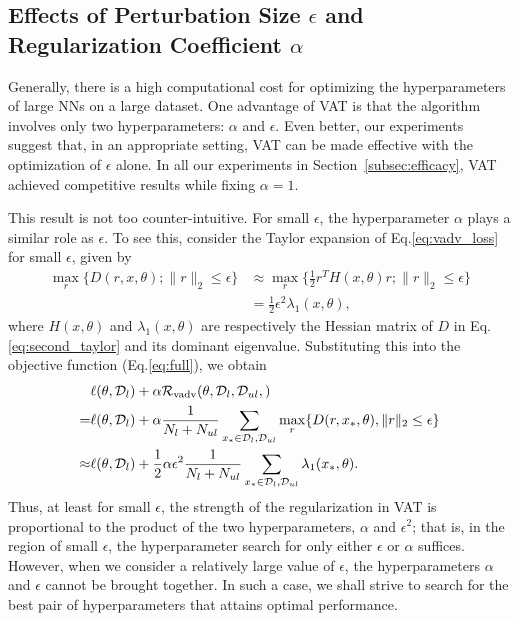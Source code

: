 \documentclass[10pt,journal,compsoc]{IEEEtran}
\begin{document}
\subsection{\label{subsec:hp}
Effects of Perturbation Size $\epsilon$ and Regularization Coefficient $\alpha$}
\noindent Generally, there is a high computational cost for optimizing the hyperparameters of large NNs on a large dataset.  
One advantage of VAT is that the algorithm involves only two hyperparameters: $\alpha$ and $\epsilon$.
Even better, our experiments suggest that, in an appropriate setting, VAT can be made effective with the optimization of $\epsilon$ alone.
In all our experiments in Section~\ref{subsec:efficacy}, VAT achieved competitive results while fixing $\alpha =1$. 

This result is not too counter-intuitive. For small $\epsilon$, the hyperparameter $\alpha$ plays a similar role as $\epsilon$. To see this, consider the Taylor expansion of Eq.\eqref{eq:vadv_loss} for small $\epsilon$, given by
\begin{align}
\max_r\{D(r, x, \theta); \|r\|_2 \leq \epsilon\} &\approx \max_r\{\frac{1}{2}r^{T}H(x,\theta)r; \|r\|_2 \leq \epsilon\}\nonumber\\
				&=\frac{1}{2} \epsilon^2 \lambda_1(x, \theta),
\end{align}
where $H(x,\theta)$ and $\lambda_1(x, \theta)$ are respectively the Hessian matrix of $D$ in Eq.\eqref{eq:second_taylor} and its dominant eigenvalue.
Substituting this into the objective function (Eq.\eqref{eq:full}), we obtain
\begin{align}
&\ell(\theta,\mathcal{D}_l) +  \alpha \mathcal{R}_{\rm vadv}(\theta, \mathcal{D}_l, \mathcal{D}_{ul}, ) \nonumber \\
=&\ell(\theta,\mathcal{D}_l) + \alpha\frac{1}{N_l+N_{ul}}\sum_{x_* \in \mathcal{D}_l, \mathcal{D}_{ul}}\max_r\{D(r, x_*, \theta),
\|r\|_2 \leq \epsilon\} \nonumber \\ 
\approx &\ell(\theta,\mathcal{D}_l) + \frac{1}{2}\alpha\epsilon^2 \frac{1}{N_l+N_{ul}}\sum_{x_* \in \mathcal{D}_l, \mathcal{D}_{ul}}\lambda_1(x_*, \theta).  \label{eq:approx_ep} 
\end{align}
Thus, at least for small $\epsilon$, the strength of the regularization in VAT is proportional to the product of the two hyperparameters, $\alpha$ and $\epsilon^2$; %
that is, in the region of small $\epsilon$, the hyperparameter search for only either $\epsilon$ or $\alpha$ suffices. However, when we consider a relatively large value of $\epsilon$, the hyperparameters $\alpha$ and $\epsilon$ cannot be brought together.
In such a case, we shall strive to search for the best pair of hyperparameters that attains optimal performance.
\end{document}
